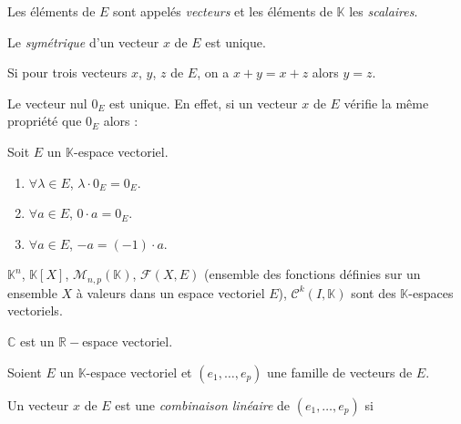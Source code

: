 \documentclass[a4paper,10pt]{report}
\begin{document}
\begin{rems}
\item Les éléments de $E$ sont appelés \textit{vecteurs} et les éléments de $\mathbb{K}$ les \textit{scalaires}.
\item Le \textit{symétrique} d'un vecteur $x$ de $E$ est unique. 
\item Si pour trois vecteurs $x$, $y$, $z$ de $E$, on a $x+y=x+z$ alors $y=z$. 
\item Le vecteur nul $0_E$ est unique. En effet, si un vecteur $x$ de $E$ vérifie la même propriété que $0_E$ alors :

\vspace{1.5cm}
\end{rems}

\begin{prop}
Soit $E$ un $\mathbb{K}$-espace vectoriel.

\begin{enumerate}
\item $\forall \lambda \in E$, $\lambda \cdot 0_E= 0_E$.
\item $\forall a \in E$, $0 \cdot a=0_E$.
\item $\forall a \in E$, $-a=(-1) \cdot a$.
\end{enumerate}
\end{prop}

\medskip

\begin{exems}
\item $\mathbb{K}^n$, $\mathbb{K}[X]$, $\mathcal{M}_{n,p}(\mathbb{K})$, $\mathcal{F}(X,E)$ (ensemble des fonctions définies sur un ensemble $X$ à valeurs dans un espace vectoriel $E$), $\mathcal{C}^k(I, \mathbb{K})$ sont des $\mathbb{K}$-espaces vectoriels.
\item $\mathbb{C}$ est un $\mathbb{R}-$espace vectoriel.
\end{exems}

\medskip

\begin{defin} Soient $E$ un $\mathbb{K}$-espace vectoriel et $(e_1, \ldots, e_p)$ une famille de vecteurs de $E$.

\noindent Un vecteur $x$ de $E$ est une \textit{combinaison linéaire} de $(e_1, \ldots, e_p)$ si 
$$ \phantom{x = \sum_{k=1}^p \lambda_k e_k = \lambda_1 e_1 + \lambda_2 e_2 + \cdots + \lambda_p e_p }$$
\end{defin}

\newpage
\end{document}
